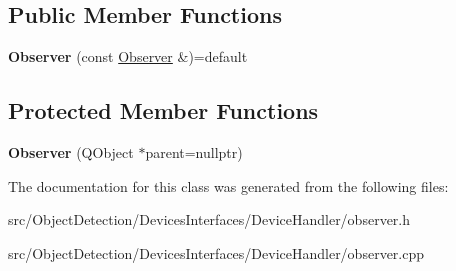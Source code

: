 \subsection*{Public Member Functions}
\begin{DoxyCompactItemize}
\item 
\mbox{\label{class_devices_1_1_observer_a749229c39b82fb5c5ece5eaa4f4be4bc}} 
{\bfseries Observer} (const \hyperlink{class_devices_1_1_observer}{Observer} \&)=default
\end{DoxyCompactItemize}
\subsection*{Protected Member Functions}
\begin{DoxyCompactItemize}
\item 
\mbox{\label{class_devices_1_1_observer_a535c8656871306792a63d03c0eda96c8}} 
{\bfseries Observer} (Q\+Object $\ast$parent=nullptr)
\end{DoxyCompactItemize}


The documentation for this class was generated from the following files\+:\begin{DoxyCompactItemize}
\item 
src/\+Object\+Detection/\+Devices\+Interfaces/\+Device\+Handler/observer.\+h\item 
src/\+Object\+Detection/\+Devices\+Interfaces/\+Device\+Handler/observer.\+cpp\end{DoxyCompactItemize}
